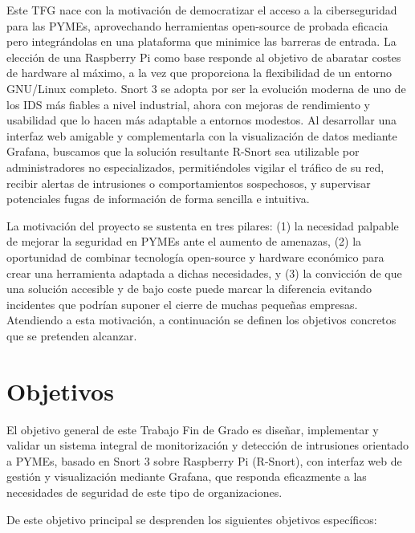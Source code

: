 \documentclass[11pt,a4paper,twoside]{report}
\begin{document}
Este TFG nace con la motivación de democratizar el acceso a la ciberseguridad para las PYMEs, aprovechando herramientas open-source de probada eficacia pero integrándolas en una plataforma que minimice las barreras de entrada. La elección de una Raspberry Pi como base responde al objetivo de abaratar costes de hardware al máximo, a la vez que proporciona la flexibilidad de un entorno GNU/Linux completo. Snort 3 se adopta por ser la evolución moderna de uno de los IDS más fiables a nivel industrial, ahora con mejoras de rendimiento y usabilidad que lo hacen más adaptable a entornos modestos. Al desarrollar una interfaz web amigable y complementarla con la visualización de datos mediante Grafana, buscamos que la solución resultante R-Snort sea utilizable por administradores no especializados, permitiéndoles vigilar el tráfico de su red, recibir alertas de intrusiones o comportamientos sospechosos, y supervisar potenciales fugas de información de forma sencilla e intuitiva.\newline

La motivación del proyecto se sustenta en tres pilares: (1) la necesidad palpable de mejorar la seguridad en PYMEs ante el aumento de amenazas, (2) la oportunidad de combinar tecnología open-source y hardware económico para crear una herramienta adaptada a dichas necesidades, y (3) la convicción de que una solución accesible y de bajo coste puede marcar la diferencia evitando incidentes que podrían suponer el cierre de muchas pequeñas empresas. Atendiendo a esta motivación, a continuación se definen los objetivos concretos que se pretenden alcanzar.

\section{Objetivos}

El objetivo general de este Trabajo Fin de Grado es diseñar, implementar y validar un sistema integral de monitorización y detección de intrusiones orientado a PYMEs, basado en Snort 3 sobre Raspberry Pi (R-Snort), con interfaz web de gestión y visualización mediante Grafana, que responda eficazmente a las necesidades de seguridad de este tipo de organizaciones.\newline

De este objetivo principal se desprenden los siguientes objetivos específicos:
\end{document}
